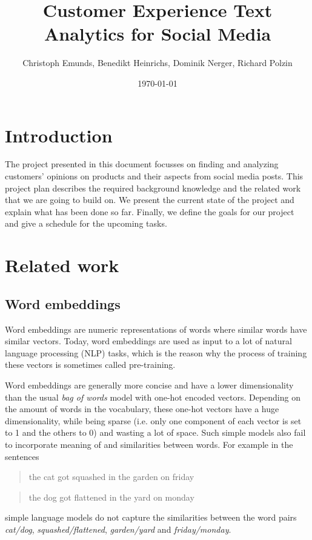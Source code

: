\documentclass[10pt,a4paper]{article}
\title{{\Huge Customer Experience Text Analytics for Social Media}}
\author{Christoph Emunds, Benedikt Heinrichs, Dominik Nerger, Richard Polzin}
\date{\today}
\begin{document}
	\maketitle
	
	\section{Introduction}
	The project presented in this document focusses on finding and analyzing customers' opinions on products and their aspects from social media posts. This project plan describes the required background knowledge and the related work that we are going to build on. We present the current state of the project and explain what has been done so far. Finally, we define the goals for our project and give a schedule for the upcoming tasks.
	
	\section{Related work}
		\subsection{Word embeddings}
		Word embeddings are numeric representations of words where similar words have similar vectors. Today, word embeddings are used as input to a lot of natural language processing (NLP) tasks, which is the reason why the process of training these vectors is sometimes called pre-training.
		
		Word embeddings are generally more concise and have a lower dimensionality than the usual \textit{bag of words} model with one-hot encoded vectors. Depending on the amount of words in the vocabulary, these one-hot vectors have a huge dimensionality, while being sparse (i.e. only one component of each vector is set to 1 and the others to 0) and wasting a lot of space. Such simple models also fail to incorporate meaning of and similarities between words. For example in the sentences
		\begin{quote}
			the cat got squashed in the garden on friday
		\end{quote}
		\begin{quote}
			the dog got flattened in the yard on monday
		\end{quote}
		simple language models do not capture the similarities between the word pairs \textit{cat/dog}, \textit{squashed/flattened}, \textit{garden/yard} and \textit{friday/monday}.
		
\end{document}
